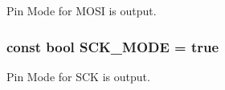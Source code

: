 Pin Mode for M\-O\-S\-I is output. \hypertarget{group__soft_s_p_i_gac89532527cf817a2f48730a107fe82ae}{
\subsubsection[{S\-C\-K\-\_\-\-M\-O\-D\-E}]{\setlength{\rightskip}{0pt plus 5cm}const bool S\-C\-K\-\_\-\-M\-O\-D\-E = true}}\label{group__soft_s_p_i_gac89532527cf817a2f48730a107fe82ae}
Pin Mode for S\-C\-K is output. 